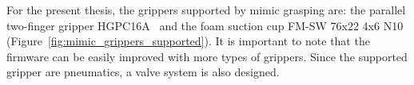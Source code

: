 \begin{figure}[h!]
\end{figure}

For the present thesis, the grippers supported by mimic grasping are: the parallel two-finger gripper HGPC16A~\cite{festo_2f} and the foam suction cup FM-SW 76x22 4x6 N10~\cite{schmalz_cup} (Figure~\ref{fig:mimic_grippers_supported}). It is important to note that the firmware can be easily improved with more types of grippers. Since the supported gripper are pneumatics, a valve system is also designed.

